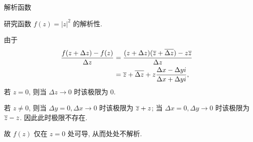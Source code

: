 \begin{frame}{解析函数}
\begin{example}
研究函数 $f(z)=|z|^2$ 的解析性.
\end{example}
\begin{solution}
\indent
由于
\vspace{-5pt}
\begin{align*}
\frac{f(z+\Delta z)-f(z)}{\Delta z}
&=\frac{(z+\Delta z)(\overline z+\overline{\Delta z})-z\overline z}{\Delta z}\\
&=\overline z+\overline{\Delta z}+z\frac{\Delta x-\Delta yi}{\Delta x+\Delta yi},
\end{align*}
\onslide<+->
若 $z=0$, 则当 $\Delta z\to 0$ 时该极限为 $0$.

\indent
\onslide<+->
若 $z\neq0$, 则当 $\Delta y=0,\Delta x\to 0$ 时该极限为 $\overline z+z$;
\onslide<+->
当 $\Delta x=0,\Delta y\to 0$ 时该极限为 $\overline z-z$.
\onslide<+->
因此此时极限不存在.

\indent
\onslide<+->
故 $f(z)$ 仅在 $z=0$ 处可导, 从而处处不解析.
\end{solution}
\end{frame}

